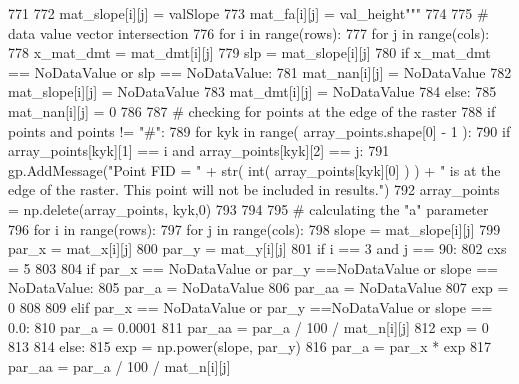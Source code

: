 \begin{DoxyCode}
{}
771 \textcolor{stringliteral}{
}
772 \textcolor{stringliteral}{      mat\_slope[i][j] = valSlope
}
773 \textcolor{stringliteral}{      mat\_fa[i][j] = val\_height"""}
774 
775   \textcolor{comment}{# data value vector intersection
}
776   \textcolor{keywordflow}{for} i \textcolor{keywordflow}{in} range(rows):
777     \textcolor{keywordflow}{for} j \textcolor{keywordflow}{in} range(cols):
778       x\_mat\_dmt = mat\_dmt[i][j]
779       slp = mat\_slope[i][j]
780       \textcolor{keywordflow}{if} x\_mat\_dmt == NoDataValue \textcolor{keywordflow}{or} slp == NoDataValue:
781           mat\_nan[i][j] = NoDataValue
782           mat\_slope[i][j] = NoDataValue
783           mat\_dmt[i][j] = NoDataValue
784       \textcolor{keywordflow}{else}:
785           mat\_nan[i][j] = 0
786 
787   \textcolor{comment}{# checking for points at the edge of the raster
}
788   \textcolor{keywordflow}{if} points \textcolor{keywordflow}{and} points != \textcolor{stringliteral}{"#"}:
789       \textcolor{keywordflow}{for} kyk \textcolor{keywordflow}{in} range( array\_points.shape[0] - 1 ):
790           \textcolor{keywordflow}{if} array\_points[kyk][1] == i \textcolor{keywordflow}{and} array\_points[kyk][2] == j:
791               gp.AddMessage(\textcolor{stringliteral}{"Point FID = "} + str( int( array\_points[kyk][0] ) ) + \textcolor{stringliteral}{" is at the edge of the
       raster. This point will not be included in results."})
792               array\_points =  np.delete(array\_points, kyk,0)
793 
794 
795   \textcolor{comment}{# calculating the "a" parameter
}
796   \textcolor{keywordflow}{for} i \textcolor{keywordflow}{in} range(rows):
797     \textcolor{keywordflow}{for} j \textcolor{keywordflow}{in} range(cols):
798       slope = mat\_slope[i][j]
799       par\_x = mat\_x[i][j]
800       par\_y = mat\_y[i][j]
801       \textcolor{keywordflow}{if} i == 3 \textcolor{keywordflow}{and} j == 90:
802         cxs = 5
803 
804       \textcolor{keywordflow}{if} par\_x == NoDataValue \textcolor{keywordflow}{or} par\_y ==NoDataValue \textcolor{keywordflow}{or} slope == NoDataValue:
805           par\_a = NoDataValue
806           par\_aa = NoDataValue
807           exp = 0
808 
809       \textcolor{keywordflow}{elif} par\_x == NoDataValue \textcolor{keywordflow}{or} par\_y ==NoDataValue \textcolor{keywordflow}{or} slope == 0.0:
810           par\_a = 0.0001
811           par\_aa = par\_a / 100 / mat\_n[i][j]
812           exp = 0
813 
814       \textcolor{keywordflow}{else}:
815           exp = np.power(slope, par\_y)
816           par\_a = par\_x * exp
817           par\_aa = par\_a / 100 / mat\_n[i][j]

\end{DoxyCode}
